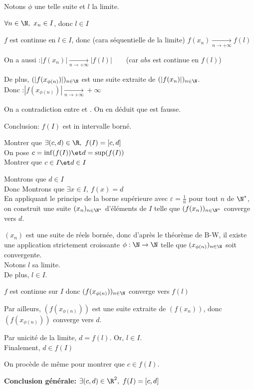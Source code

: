 \documentclass[12pt,twoside,a4paper]{article}
\begin{document}
\begin{preuve}
\begin{liste}
\begin{tab}
						Notons $\phi$ une telle suite et $l$ la limite.
						\begin{liste}
							\item $\forall n\in\N,\ x_n\in I$, donc $l\in I$
							\item $f$ est continue en $l\in I$, donc (cara s\'equentielle de la limite) $f(x_n)\mathop{\longrightarrow}\limits_{n\rightarrow +\infty}f(l)$
							\item On a aussi :$|f(x_n)|\mathop{\longrightarrow}\limits_{n\rightarrow +\infty}|f(l)|$\ \ \ \ (car $abs$ est continue en $f(l)$)
							\item De plus, $(|f(x_{\phi(n)})|)_{n\in\N}$ est une suite extraite de $(|f(x_{n})|)_{n\in\N}$.\\
								Donc :$|f(x_{\phi(n)})|\mathop{\longrightarrow}\limits_{n\rightarrow +\infty}+\infty$
						\end{liste}
						On a contradiction entre  et . On en d\'eduit que \fbox{HA} est fausse.
					\end{tab}
					Conclusion: $f(I)$ est in intervalle born\'e.
				\item Montrer que $\exists (c,d)\in\R,\ f(I)=[c,d]$\\
					On pose $c=\inf(f(I))\et d=\sup(f(I))$\\
					Montrer que $c\in I\et d\in I$
					\begin{liste}
						\item Montrons que $d\in I$\\
							Donc Montrons que $\exists x\in I,\ f(x)=d$\\
							En appliquant le principe de la borne sup\'erieure avec $\varepsilon = \frac1{n}$ pour tout $n$ de $\N^{*}$, on construit une suite $(x_n)_{n\in\N^{*}}$ d'\'el\'ements de $I$ telle que $(f(x_n))_{n\in\N^{*}}$ converge vers $d$.
							\begin{liste}
								\item $(x_n)$ est une suite de r\'eels born\'ee, donc d'apr\`es le th\'eor\`eme de B-W, il existe une application strictement croissante $\phi:\N\rightarrow\N$ telle que $(x_{\phi(n)})_{n\in\N}$ soit convergente.\\
									Notons $l$ sa limite.\\
									De plus, $l\in I$.
								\item $f$ est continue sur $I$ donc $(f(x_{\phi(n)}))_{n\in\N}$ converge vers $f(l)$
								\item Par ailleurs, $(f(x_{\phi(n)}))$ est une suite extraite de $(f(x_n))$, donc $(f(x_{\phi(n)}))$ converge vers $d$.
							\end{liste}
							Par unicit\'e de la limite, $d=f(l)$. Or, $l\in I$.\\
							Finalement, $d\in f(I)$
						\item On proc\`ede de m\^eme pour montrer que $c\in f(I)$.
					\end{liste}
			\end{liste}
			\textbf{Conclusion g\'en\'erale:} $\exists (c,d)\in \R^{2},\ f(I)=[c,d]$
		\end{preuve}
\end{document}
